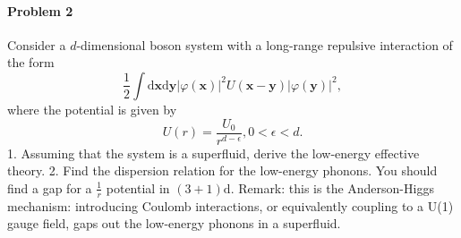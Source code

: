\documentclass[hyperref, a4paper]{article}
\begin{document}
\paragraph{Problem 2} Consider a $d$-dimensional boson system with a long-range repulsive interaction of the form
$$
\frac{1}{2} \int \mathrm{d} \mathbf{x} \mathrm{d} \mathbf{y}|\varphi(\mathbf{x})|^2 U(\mathbf{x}-\mathbf{y})|\varphi(\mathbf{y})|^2,
$$
where the potential is given by
$$
U(r)=\frac{U_0}{r^{d-\epsilon}}, 0<\epsilon<d .
$$
1. Assuming that the system is a superfluid, derive the low-energy effective theory.
2. Find the dispersion relation for the low-energy phonons. You should find a gap for a $\frac{1}{r}$ potential in $(3+1) \mathrm{d}$.
Remark: this is the Anderson-Higgs mechanism: introducing Coulomb interactions, or equivalently coupling to a U(1) gauge field, gaps out the low-energy phonons in a superfluid.
\end{document}
